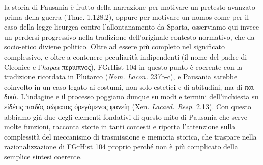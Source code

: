 {la storia di Pausania  è frutto della narrazione per motivare un pretesto avanzato prima della guerra (Thuc. 1.128.2), oppure per motivare un nomos come per il caso della legge licurgea contro l'allontanamento da Sparta, osserviamo qui invece un perdersi progressivo nella tradizione dell'originale contesto normativo, che da socio-etico diviene politico. Oltre ad essere più completo nel significato complessivo, e oltre a contenere peculiarità indipendenti (il nome del padre di Cleonice e l'\emph{hapax} \textgreek{περίυπνος}), FGrHist 104 in questo punto è coerente con la tradizione ricordata in Plutarco (\emph{Nom. Lacon.} 237b-c), e Pausania  sarebbe coinvolto in un caso legato ai costumi, non solo estetici e di abitudini, ma di \textgreek{παιδικά}. L'indagine e il processo poggiano dunque su modi e termini dell'inchiesta su \textgreek{εἰδέτις παιδὸς σώματος ὀρεγόμενος φανείη} (Xen.\emph{ Lacaed. Resp.} 2.13). Con questo abbiamo già due degli elementi fondativi di questo mito di Pausania  che serve molte funzioni, racconta storie in tanti contesti e riporta l'attenzione sulla complessità del meccanismo di trasmissione e memoria storica, che traspare nella razionalizzazione di FGrHist 104 proprio perché non è più complicato della semplice sintesi coerente. 
}
